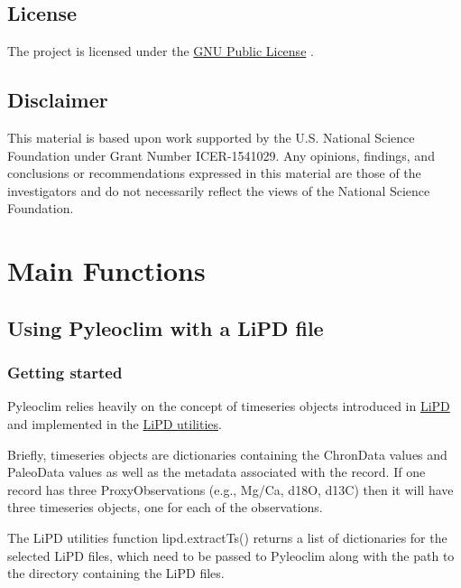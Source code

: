 \documentclass[letterpaper,10pt,english]{sphinxmanual}
\begin{document}
\section{License}
\label{\detokenize{Introduction:license}}
The project is licensed under the \href{https://github.com/LinkedEarth/Pyleoclim\_util/blob/master/license}{GNU Public License} .


\section{Disclaimer}
\label{\detokenize{Introduction:disclaimer}}
This material is based upon work supported by the U.S. National Science Foundation under Grant Number
ICER-1541029. Any opinions, findings, and conclusions or recommendations expressed in this material are those
of the investigators and do not necessarily reflect the views of the National Science Foundation.


\chapter{Main Functions}
\label{\detokenize{Main:main-functions}}\label{\detokenize{Main::doc}}

\section{Using Pyleoclim with a LiPD file}
\label{\detokenize{Main:using-pyleoclim-with-a-lipd-file}}

\subsection{Getting started}
\label{\detokenize{Main:getting-started}}
Pyleoclim relies heavily on the concept of timeseries objects introduced in
\href{http://www.clim-past.net/12/1093/2016/}{LiPD} and implemented in the
\href{http://nickmckay.github.io/LiPD-utilities/}{LiPD utilities}.

Briefly, timeseries objects are dictionaries containing the ChronData values and
PaleoData values as well as the metadata associated with the record. If one record
has three ProxyObservations (e.g., Mg/Ca, d18O, d13C) then it will have three timeseries
objects, one for each of the observations.

The LiPD utilities function lipd.extractTs() returns a list of dictionaries for
the selected LiPD files, which need to be passed to Pyleoclim along with the path
to the directory containing the LiPD files.
\end{document}
